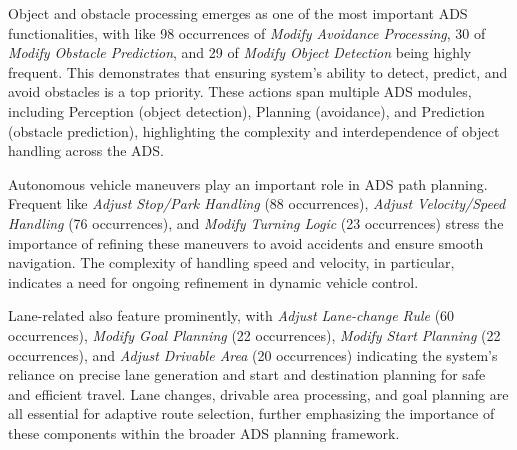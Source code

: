 \begin{figure}[ht]
    \centering
    \noindent{}
    \caption{}
    \label{fig:ds_bfa}
\end{figure}


Object and obstacle processing emerges as one of the most important ADS functionalities, with \bfas like 98 occurrences of \textit{Modify Avoidance Processing}, 30 of \textit{Modify Obstacle Prediction}, and 29 of \textit{Modify Object Detection} being highly frequent. This demonstrates that ensuring system's ability to detect, predict, and avoid obstacles is a top priority. These actions span multiple ADS modules, including Perception (object detection), Planning (avoidance), and Prediction (obstacle prediction), highlighting the complexity and interdependence of object handling across the ADS.

\vspace{-1ex}
\begin{finding}
\label{finding:rq2_obs}
\end{finding}
\vspace{-1ex}

Autonomous vehicle maneuvers play an important role in ADS path planning. Frequent \bfas like \textit{Adjust Stop/Park Handling} (88 occurrences), \textit{Adjust Velocity/Speed Handling} (76 occurrences), and \textit{Modify Turning Logic} (23 occurrences) stress the importance of refining these maneuvers to avoid accidents and ensure smooth navigation. The complexity of handling speed and velocity, in particular, indicates a need for ongoing refinement in dynamic vehicle control.

Lane-related \bfas also feature prominently, with \textit{Adjust Lane-change Rule} (60 occurrences), \textit{Modify Goal Planning} (22 occurrences), \textit{Modify Start Planning} (22 occurrences), and \textit{Adjust Drivable Area} (20 occurrences) indicating the system's reliance on precise lane generation and start and destination planning for safe and efficient travel. Lane changes, drivable area processing, and goal planning are all essential for adaptive route selection, further emphasizing the importance of these components within the broader ADS planning framework.

